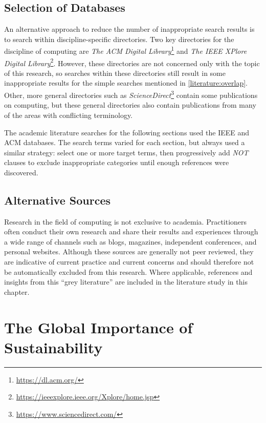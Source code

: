\subsection{Selection of Databases}
\label{literature:databases}

An alternative approach to reduce the number of inappropriate search results is to search within discipline-specific directories. Two key directories for the discipline of computing are \emph{The ACM Digital Library}\footnote{\url{https://dl.acm.org/}} and \emph{The IEEE XPlore Digital Library}\footnote{\url{https://ieeexplore.ieee.org/Xplore/home.jsp}}. However, these directories are not concerned only with the topic of this research, so searches within these directories still result in some inappropriate results for the simple searches mentioned in \autoref{literature:overlap}. Other, more general directories such as \emph{ScienceDirect}\footnote{\url{https://www.sciencedirect.com/}} contain some publications on computing, but these general directories also contain publications from many of the areas with conflicting terminology.

The academic literature searches for the following sections used the IEEE and ACM databases. The search terms varied for each section, but always used a similar strategy: select one or more target terms, then progressively add \emph{NOT} clauses to exclude inappropriate categories until enough references were discovered.

\subsection{Alternative Sources}
\label{literature:alternatives}

Research in the field of computing is not exclusive to academia. Practitioners often conduct their own research and share their results and experiences through a wide range of channels such as blogs, magazines, independent conferences, and personal websites. Although these sources are generally not peer reviewed, they are indicative of current practice and current concerns and should therefore not be automatically excluded from this research. Where applicable, references and insights from this \enquote{grey literature} are included in the literature study in this chapter.


\section{The Global Importance of Sustainability}
\label{literature:importance}

